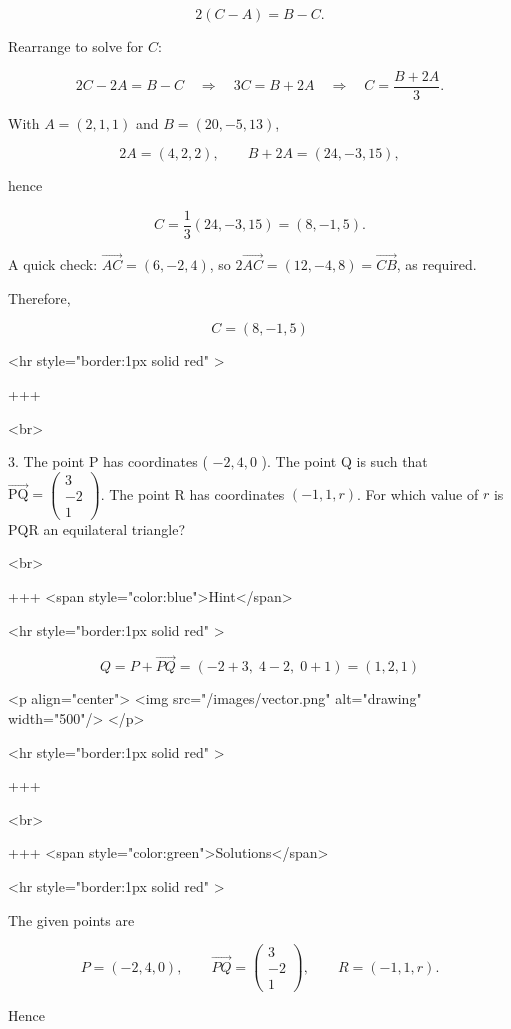$$
2(C-A)=B-C.
$$

Rearrange to solve for $C$:

$$
2C-2A=B-C \quad\Longrightarrow\quad 3C=B+2A \quad\Longrightarrow\quad C=\frac{B+2A}{3}.
$$

With $A=(2,1,1)$ and $B=(20,-5,13)$,

$$
2A=(4,2,2),\qquad B+2A=(24,-3,15),
$$

hence

$$
C=\frac{1}{3}(24,-3,15)=(8,-1,5).
$$


A quick check: $\overrightarrow{AC}=(6,-2,4)$, so $2\overrightarrow{AC}=(12,-4,8)=\overrightarrow{CB}$, as required.

Therefore,

$$
C=(8,-1,5)
$$

<hr style="border:1px solid red" >

+++

<br>

3. The point P has coordinates ( $-2,4,0$ ).
The point Q is such that $\overrightarrow{\mathrm{PQ}}=\left(\begin{array}{c}3 \\ -2 \\ 1\end{array}\right)$.
The point R has coordinates $(-1,1, r)$.
For which value of $r$ is PQR an equilateral triangle?

<br>

+++ <span style="color:blue">Hint</span>

<hr style="border:1px solid red" >

$$
Q=P+\overrightarrow{PQ}=( -2+3,\;4-2,\;0+1)=(1,2,1)
$$

<p align="center">
<img src="/images/vector.png" alt="drawing" width="500"/>
</p>

<hr style="border:1px solid red" >

+++

<br>

+++ <span style="color:green">Solutions</span>

<hr style="border:1px solid red" >

The given points are

$$
P=(-2,4,0),\qquad \overrightarrow{PQ}=\begin{pmatrix}3\\-2\\1\end{pmatrix},
\qquad R=(-1,1,r).
$$

Hence

